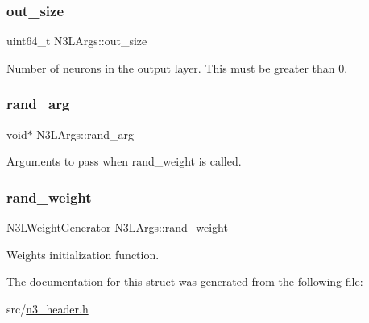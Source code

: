 \subsubsection{\texorpdfstring{out\+\_\+size}{out\_size}}
{\footnotesize\ttfamily uint64\+\_\+t N3\+L\+Args\+::out\+\_\+size}

Number of neurons in the output layer. This must be greater than 0. \mbox{\label{structN3LArgs_a9df79247b5160e5261683a535654cc18}} 
\subsubsection{\texorpdfstring{rand\+\_\+arg}{rand\_arg}}
{\footnotesize\ttfamily void$\ast$ N3\+L\+Args\+::rand\+\_\+arg}

Arguments to pass when {\ttfamily rand\+\_\+weight} is called. \mbox{\label{structN3LArgs_ac6f4a8939deb104e8b154860904f3b45}} 
\subsubsection{\texorpdfstring{rand\+\_\+weight}{rand\_weight}}
{\footnotesize\ttfamily \hyperlink{n3__header_8h_ab3b7d8e984e9ad2e4d5e7cbe433ad572}{N3\+L\+Weight\+Generator} N3\+L\+Args\+::rand\+\_\+weight}

Weights initialization function. 

The documentation for this struct was generated from the following file\+:\begin{DoxyCompactItemize}
\item 
src/\hyperlink{n3__header_8h}{n3\+\_\+header.\+h}\end{DoxyCompactItemize}
